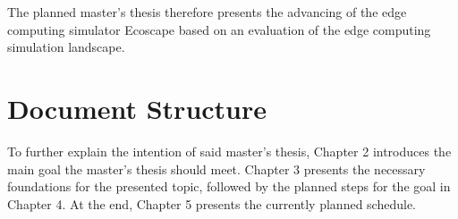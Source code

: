   
  The planned master's thesis therefore presents the advancing of the edge computing simulator Ecoscape based on an evaluation of the edge computing simulation landscape.

\section{Document Structure}
To further explain the intention of said master's thesis, Chapter 2 introduces the main goal the master's thesis should meet.
Chapter 3 presents the necessary foundations for the presented topic, followed by the planned steps for the goal in Chapter 4.
At the end, Chapter 5 presents the currently planned schedule.